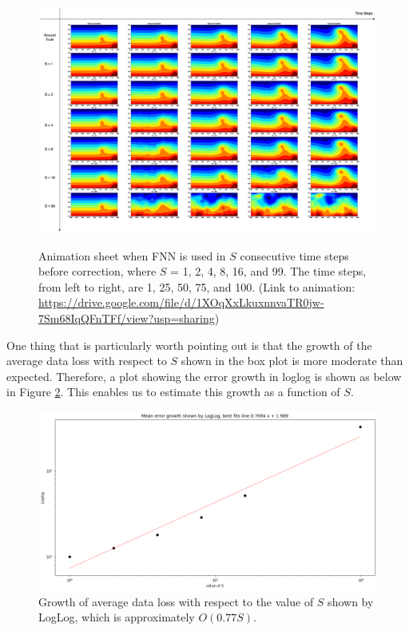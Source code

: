 \begin{figure}[H]
    \centering
    \caption{Animation sheet when FNN is used in $S$ consecutive time steps before correction, where $S$ = 1, 2, 4, 8, 16, and 99. The time steps, from left to right, are 1, 25, 50, 75, and 100. (Link to animation: \url{https://drive.google.com/file/d/1XOqXxLkuxnnvaTR0jw-7Sm68IqQFnTFf/view?usp=sharing})}
    \includegraphics[scale=0.30]{figures/mantle_convection_images/further_testings/FNN_further_testing_sheet.png}
    \label{figure:further_GIF}
\end{figure}

One thing that is particularly worth pointing out is that the growth of the average data loss with respect to $S$ shown in the box plot is more moderate than expected. Therefore, a plot showing the error growth in loglog is shown as below in Figure \ref{figure:further_loglog}. This enables us to estimate this growth as a function of $S$.

\begin{figure}[H]
    \centering
    \includegraphics[scale=0.4]{figures/mantle_convection_images/further_testings/FNN_LogLog.png}
    \caption{Growth of average data loss with respect to the value of $S$ shown by LogLog, which is approximately $O(0.77S)$.}
    \label{figure:further_loglog}
\end{figure}

